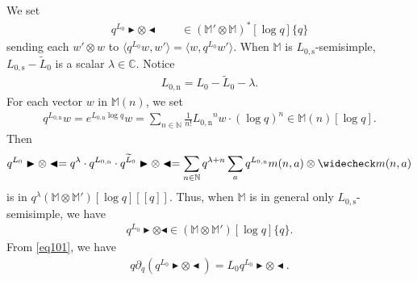 \documentclass[12pt,a4paper,notitlepage]{article}
\theoremstyle{definition}
\theoremstyle{plain}
\newcommand{\wtd}{\widetilde}
\newcommand{\wch}{\widecheck}
\newcommand{\bk}[1]{\langle {#1}\rangle}
\newcommand{\Mbb}{\mathbb M}
\newcommand{\Cbb}{\mathbb C}
\newcommand{\Nbb}{\mathbb N}
\newcommand{\btl}{\blacktriangleleft}
\newcommand{\btr}{\blacktriangleright}
\newcommand{\Lss}{L_{0,\mathrm{s}}}
\newcommand{\Lni}{{L_{0,\mathrm{n}}}}
\numberwithin{equation}{section}
\begin{document}
We set
\begin{align}
q^{L_0}\btr\otimes\btl\qquad\in(\Mbb'\otimes\Mbb)^*[\log q]\{q\}\label{eq109}
\end{align}
sending each $w'\otimes w$ to $\bk{q^{L_0}w,w'}=\bk{w,q^{L_0}w'}$. When $\Mbb$ is $\Lss$-semisimple, $\Lss-\wtd L_0$ is a scalar $\lambda\in\Cbb$.  Notice 
\begin{align}\label{eq100}
\Lni=L_0-\wtd L_0-\lambda.
\end{align}
For each vector $w$ in $\Mbb(n)$, we set
\begin{align*}
q^\Lni w=e^{\Lni\log q}w=\sum_{n\in\Nbb}\frac 1{n!}\Lni^nw\cdot (\log q)^n\in	\Mbb(n)[\log q].
\end{align*}
Then
\begin{align}
q^{L_0}\btr\otimes\btl=q^\lambda\cdot q^{\Lni}\cdot q^{\wtd L_0}\btr\otimes\btl=\sum_{n\in\Nbb}q^{\lambda+n}\sum_a q^\Lni m(n,a)\otimes\wch m(n,a)
\end{align}
is in $q^{\lambda}(\Mbb\otimes\Mbb')[\log q][[q]]$. Thus, when $\Mbb$ is in general only $\Lss$-semisimple, we have
\begin{align}
q^{L_0}\btr\otimes\btl\in(\Mbb\otimes\Mbb')[\log q]\{q\}.	
\end{align}
From \eqref{eq101}, we have
\begin{align}
q\partial_q (q^{L_0}\btr\otimes\btl)=L_0q^{L_0}\btr\otimes\btl.\label{eq102}	
\end{align} 
\end{document}
